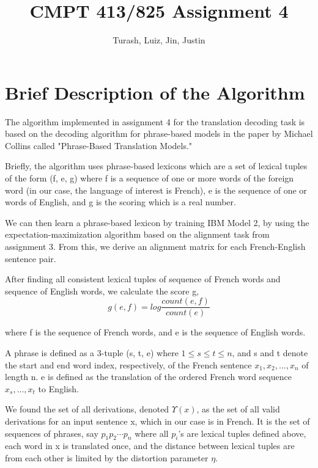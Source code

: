 \documentclass{article}
\begin{document}
\begin{titlepage}
	\title{CMPT 413/825 Assignment 4}
	\author{Turash, Luiz, Jin, Justin}
	\maketitle
\end{titlepage}

\section{Brief Description of the Algorithm}
	The algorithm implemented in assignment 4 for the translation decoding task is based on the decoding algorithm for phrase-based models in the paper by Michael Collins called "Phrase-Based Translation Models."
	
	Briefly, the algorithm uses phrase-based lexicons which are a set of lexical tuples of the form (f, e, g) where f is a sequence of one or more words of the foreign word (in our case, the language of interest is French), e is the sequence of one or words of English, and g is the scoring which is a real number.
	
	We can then learn a phrase-based lexicon by training IBM Model 2, by using the expectation-maximization algorithm based on the alignment task from assignment 3. From this, we derive an alignment matrix for each French-English sentence pair.
	
	After finding all consistent lexical tuples of sequence of French words and sequence of English words, we calculate the score g, 
	\[g(e, f) = log \frac{count(e, f)}{count(e)}\]
	 
	 where f is the sequence of French words, and e is the sequence of English words.
	 
	 A phrase is defined as a 3-tuple (s, t, e) where $1 \leq s \leq t \leq n$, and s and t denote the start and end word index, respectively, of the French sentence $x_{1}, x_{2}, ... , x_{n}$ of length n. e is defined as the translation of the ordered French word sequence $ x_{s}, ..., x_{t} $  to English.
	 
	 We found the set of all derivations, denoted $ \Upsilon (x)$, as the set of all valid derivations for an input sentence x, which in our case is in French. It is the set of sequences of phrases, say $p_{1}p_{2}\cdots p_{n}$ where all $p_{i}$'s are lexical tuples defined above, each word in x is translated once, and the distance between lexical tuples are from each other is limited by the distortion parameter $\eta$.
	 
\end{document}
